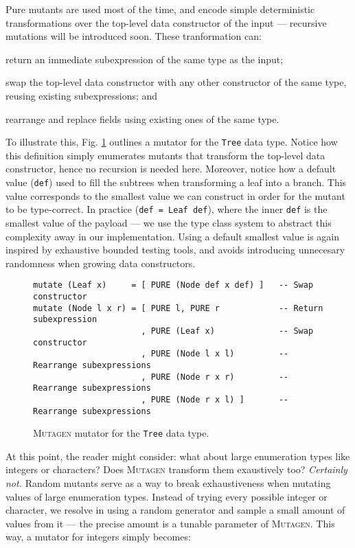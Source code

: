 \documentclass[acmsmall, anonymous]{acmart}
\newcommand{\mutagen}{\textsc{Mutagen}\xspace}
\begin{document}
Pure mutants are used most of the time, and encode simple deterministic
transformations over the top-level data constructor of the input --- recursive
mutations will be introduced soon.
%
These tranformation can:
%
\begin{inparaenum}
\item return an immediate subexpression of the same type as the input;
\item swap the top-level data constructor with any other constructor of the same
  type, reusing existing subexpressions; and
\item rearrange and replace fields using existing ones of the same type.
\end{inparaenum}
%
To illustrate this, Fig. \ref{fig:mutagen:mutator} outlines a mutator for the
\texttt{Tree} data type.
%
Notice how this definition simply enumerates mutants that transform the
top-level data constructor, hence no recursion is needed here.
%
Moreover, notice how a default value (\texttt{def}) used to fill the subtrees
when transforming a leaf into a branch.
%
This value corresponds to the smallest value we can construct in order for the
mutant to be type-correct.
%
In practice (\texttt{def = Leaf def}), where the inner \texttt{def} is the
smallest value of the payload --- we use the type class system to abstract this
complexity away in our implementation.
%
Using a default smallest value is again inspired by exhaustive bounded testing
tools, and avoids introducing unnecesary randomness when growing data
constructors.

\begin{figure}
\begin{verbatim}
mutate (Leaf x)     = [ PURE (Node def x def) ]   -- Swap constructor
mutate (Node l x r) = [ PURE l, PURE r            -- Return subexpression
                      , PURE (Leaf x)             -- Swap constructor
                      , PURE (Node l x l)         -- Rearrange subexpressions
                      , PURE (Node r x r)         -- Rearrange subexpressions
                      , PURE (Node r x l) ]       -- Rearrange subexpressions
\end{verbatim}
\caption{\label{fig:mutagen:mutator}\mutagen mutator for the \texttt{Tree} data
  type.}
\end{figure}

At this point, the reader might consider:
%
what about large enumeration types like integers or characters?
%
Does \mutagen transform them exaustively too?
%
\emph{Certainly not.}
%
Random mutants serve as a way to break exhaustiveness when mutating values of
large enumeration types.
%
Instead of trying every possible integer or character, we resolve in using a
random generator and sample a small amount of values from it --- the precise
amount is a tunable parameter of \mutagen.
%
This way, a mutator for integers simply becomes:
\end{document}
